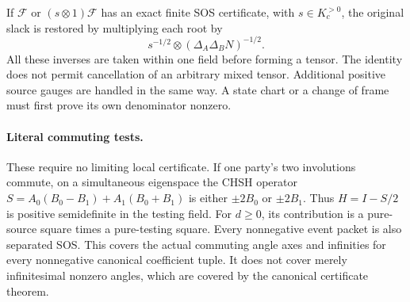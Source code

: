 If $\mathcal F$ or $(s\otimes1)\mathcal F$ has an exact finite SOS
certificate, with $s\in K_c^{>0}$, the original slack is restored by
multiplying each root by
\[
 s^{-1/2}\otimes(\Delta_A\Delta_BN)^{-1/2}.
 \tag{RFA13}
\]
All these inverses are taken within one field before forming a tensor.
The identity does not permit cancellation of an arbitrary mixed tensor.
Additional positive source gauges are handled in the same way. A state
chart or a change of frame must first prove its own denominator nonzero.

\paragraph{Literal commuting tests.}
These require no limiting local certificate. If one party's two
involutions commute, on a simultaneous eigenspace the CHSH operator
$S=A_0(B_0-B_1)+A_1(B_0+B_1)$ is either $\pm2B_0$ or $\pm2B_1$.
Thus $H=I-S/2$ is positive semidefinite in the testing field. For
$d\geq0$, its contribution is a pure-source square times a
pure-testing square. Every nonnegative event packet is also separated
SOS. This covers the actual commuting angle axes and infinities for
every nonnegative canonical coefficient tuple. It does not cover merely
infinitesimal nonzero angles, which are covered by the canonical certificate theorem.

